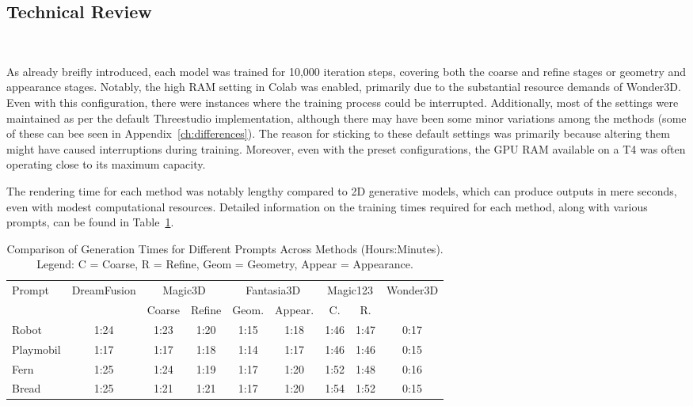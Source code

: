 \subsection{Technical Review}~\label{technical}

As already breifly introduced, each model was trained for 10,000 iteration steps, covering both the coarse and refine stages or geometry and appearance stages. Notably, the high RAM setting in Colab was enabled, primarily due to the substantial resource demands of Wonder3D. Even with this configuration, there were instances where the training process could be interrupted. Additionally, most of the settings were maintained as per the default Threestudio implementation, although there may have been some minor variations among the methods (some of these can bee seen in Appendix~\ref{ch:differences}). The reason for sticking to these default settings was primarily because altering them might have caused interruptions during training. Moreover, even with the preset configurations, the GPU RAM available on a T4 was often operating close to its maximum capacity.

The rendering time for each method was notably lengthy compared to 2D generative models, which can produce outputs in mere seconds, even with modest computational resources. Detailed information on the training times required for each method, along with various prompts, can be found in Table~\ref{table:generation_times_complex}.

\begin{table}[ht]
    \centering
    \small 
    \begin{tabular}{lcccccccc}
    \toprule
    Prompt & DreamFusion & \multicolumn{2}{c}{Magic3D} & \multicolumn{2}{c}{Fantasia3D} & \multicolumn{2}{c}{Magic123} & Wonder3D \\
    \cmidrule(r){3-4} \cmidrule(lr){5-6} \cmidrule(l){7-8}
    & & \multicolumn{1}{c}{Coarse} & \multicolumn{1}{c}{Refine} & \multicolumn{1}{c}{Geom.} & \multicolumn{1}{c}{Appear.} & \multicolumn{1}{c}{C.} & \multicolumn{1}{c}{R.} &  \\
    \midrule
    Robot & 1:24 & 1:23 & 1:20 & 1:15 & 1:18 & 1:46 & 1:47 & 0:17 \\
    Playmobil & 1:17 & 1:17 & 1:18 & 1:14 & 1:17 & 1:46 & 1:46 & 0:15 \\
    Fern & 1:25 & 1:24 & 1:19 & 1:17 & 1:20 & 1:52 & 1:48 & 0:16 \\
    Bread & 1:25 & 1:21 & 1:21 & 1:17 & 1:20 & 1:54 & 1:52 & 0:15 \\
    \bottomrule
    \end{tabular}
    \caption{Comparison of Generation Times for Different Prompts Across Methods (Hours:Minutes). Legend: C = Coarse, R = Refine, Geom = Geometry, Appear = Appearance.}~\label{table:generation_times_complex}
\end{table}

